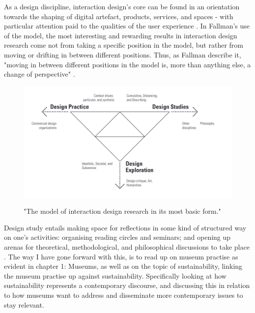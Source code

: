 As a design discipline, interaction design’s core can be found in an orientation towards the shaping of digital artefact, products, services, and spaces - with particular attention paid to the qualities of the user experience \autocite[p. 4]{fallman_triangle_2008}. In Fallman’s use of the model, the most interesting and rewarding results in interaction design research come not from taking a specific position in the model, but rather from moving or drifting in between different positions. Thus, as Fallman describe it, "moving in between different positions in the model is, more than anything else, a change of perspective" \autocite[p. 10]{fallman_triangle_2008}.


\begin{figure}[H]
\includegraphics[width=13cm]{pictures/process/triangle.png}
\caption{"The model of interaction design research in its most basic form."}
\autocite[p. 5]{fallman_triangle_2008}
\centering 
\end{figure}



Design study entails making space for reflections in some kind of structured way on one’s activities: organising reading circles and seminars; and opening up arenas for theoretical, methodological, and philosophical discussions to take place \autocite[p. 18]{fallman_triangle_2008}. The way I have gone forward with this, is to read up on museum practise as evident in chapter 1: Museums, as well as on the topic of sustainability, linking the museum practise up against sustainability. Specifically looking at how sustainability represents a contemporary discourse, and discussing this in relation to how museums want to address and disseminate more contemporary issues to stay relevant. 


